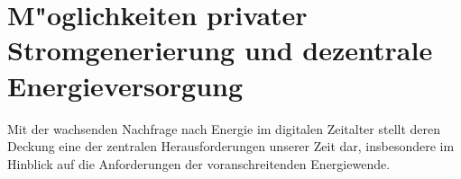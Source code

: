 \section{M"oglichkeiten privater Stromgenerierung und dezentrale Energieversorgung}
\label{sec:einleitung}

Mit der wachsenden Nachfrage nach Energie im digitalen Zeitalter stellt deren Deckung eine der zentralen Herausforderungen unserer Zeit dar, insbesondere im Hinblick auf die Anforderungen der voranschreitenden Energiewende. 